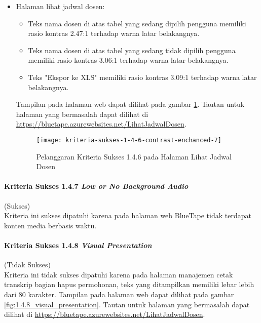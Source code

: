 \begin{itemize}
    \item Halaman lihat jadwal dosen: 
    \begin{itemize}
        \item Teks nama dosen di atas tabel yang sedang dipilih pengguna memiliki rasio kontras 2.47:1 terhadap warna latar belakangnya.
        \item Teks nama dosen di atas tabel yang sedang tidak dipilih pengguna memiliki rasio kontras 3.06:1 terhadap warna latar belakangnya.
        \item Teks "Ekspor ke XLS" memiliki rasio kontras 3.09:1 terhadap warna latar belakangnya.
    \end{itemize}
    Tampilan pada halaman web dapat dilihat pada gambar \ref{fig:1.4.6_contrast_enchanced_7}. Tautan untuk halaman yang bermasalah dapat dilihat di \url{https://bluetape.azurewebsites.net/LihatJadwalDosen}.
    \begin{figure}[H]
        \centering  
        \texttt{[image: kriteria-sukses-1-4-6-contrast-enchanced-7]}  
        \caption[Pelanggaran Kriteria Sukses 1.4.6 pada Halaman Lihat Jadwal Dosen]{Pelanggaran Kriteria Sukses 1.4.6 pada Halaman Lihat Jadwal Dosen}
        \label{fig:1.4.6_contrast_enchanced_7}  
    \end{figure} 
\end{itemize}

\paragraph{Kriteria Sukses 1.4.7 \textit{Low or No Background Audio}}
\label{par:kepatuhan_bluetape_kriteria_sukses_1.4.7}
(Sukses)\\

Kriteria ini sukses dipatuhi karena pada halaman web BlueTape tidak terdapat konten media berbasis waktu.

\paragraph{Kriteria Sukses 1.4.8 \textit{Visual Presentation}}
\label{par:kepatuhan_bluetape_kriteria_sukses_1.4.8}
(Tidak Sukses)\\

Kriteria ini tidak sukses dipatuhi karena pada halaman manajemen cetak transkrip bagian hapus permohonan, teks yang ditampilkan memiliki lebar lebih dari 80 karakter. Tampilan pada halaman web dapat dilihat pada gambar \ref{fig:1.4.8_visual_presentation}. Tautan untuk halaman yang bermasalah dapat dilihat di \url{https://bluetape.azurewebsites.net/LihatJadwalDosen}.

